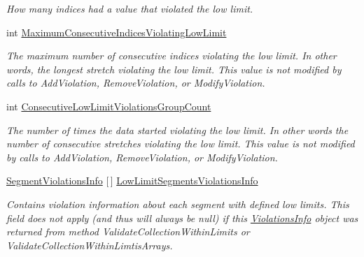 \begin{DoxyCompactItemize}
\begin{DoxyCompactList}\small\item\em How many indices had a value that violated the low limit. \end{DoxyCompactList}\item 
int \mbox{\hyperlink{struct_c_s_i_1_1_library_1_1_array_utilities_1_1_array_limit_checks_1_1_violations_info_ab377e2176f754f4814233b53779db71f}{Maximum\+Consecutive\+Indices\+Violating\+Low\+Limit}}
\begin{DoxyCompactList}\small\item\em The maximum number of consecutive indices violating the low limit. In other words, the longest stretch violating the low limit. This value is not modified by calls to Add\+Violation, Remove\+Violation, or Modify\+Violation. \end{DoxyCompactList}\item 
int \mbox{\hyperlink{struct_c_s_i_1_1_library_1_1_array_utilities_1_1_array_limit_checks_1_1_violations_info_a6d1b4da5f23284f904e81ebb4e5f42ef}{Consecutive\+Low\+Limit\+Violations\+Group\+Count}}
\begin{DoxyCompactList}\small\item\em The number of times the data started violating the low limit. In other words the number of consecutive stretches violating the low limit. This value is not modified by calls to Add\+Violation, Remove\+Violation, or Modify\+Violation. \end{DoxyCompactList}\item 
\mbox{\hyperlink{class_c_s_i_1_1_library_1_1_array_utilities_1_1_array_limit_checks_1_1_segment_violations_info}{Segment\+Violations\+Info}} \mbox{[}$\,$\mbox{]} \mbox{\hyperlink{struct_c_s_i_1_1_library_1_1_array_utilities_1_1_array_limit_checks_1_1_violations_info_ab8eab78c041033f61adb35376d39b9db}{Low\+Limit\+Segments\+Violations\+Info}}
\begin{DoxyCompactList}\small\item\em Contains violation information about each segment with defined low limits. This field does not apply (and thus will always be null) if this \mbox{\hyperlink{struct_c_s_i_1_1_library_1_1_array_utilities_1_1_array_limit_checks_1_1_violations_info}{Violations\+Info}} object was returned from method Validate\+Collection\+Within\+Limits or Validate\+Collection\+Within\+Limtis\+Arrays. \end{DoxyCompactList}\item 

\end{DoxyCompactItemize}

